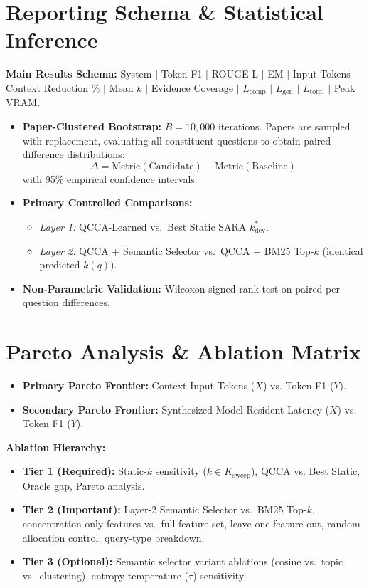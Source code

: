 \documentclass[11pt,a4paper]{article}
\begin{document}
\section{Reporting Schema \& Statistical Inference}
\textbf{Main Results Schema:} System $\mid$ Token F1 $\mid$ ROUGE-L $\mid$ EM $\mid$ Input Tokens $\mid$ Context Reduction \% $\mid$ Mean $k$ $\mid$ Evidence Coverage $\mid$ $L_{\text{comp}}$ $\mid$ $L_{\text{gen}}$ $\mid$ $L_{\text{total}}$ $\mid$ Peak VRAM.
\begin{itemize}
    \item \textbf{Paper-Clustered Bootstrap:} $B=10{,}000$ iterations. Papers are sampled with replacement, evaluating all constituent questions to obtain paired difference distributions:
    \begin{equation*}
    \Delta = \text{Metric}(\text{Candidate}) - \text{Metric}(\text{Baseline})
    \end{equation*}
    with 95\% empirical confidence intervals.
    \item \textbf{Primary Controlled Comparisons:}
    \begin{itemize}
        \item \textit{Layer 1:} QCCA-Learned vs.\ Best Static SARA $k_{\text{dev}}^*$.
        \item \textit{Layer 2:} QCCA + Semantic Selector vs.\ QCCA + BM25 Top-$k$ (identical predicted $k(q)$).
    \end{itemize}
    \item \textbf{Non-Parametric Validation:} Wilcoxon signed-rank test on paired per-question differences.
\end{itemize}

\section{Pareto Analysis \& Ablation Matrix}
\begin{itemize}
    \item \textbf{Primary Pareto Frontier:} Context Input Tokens ($X$) vs. Token F1 ($Y$).
    \item \textbf{Secondary Pareto Frontier:} Synthesized Model-Resident Latency ($X$) vs. Token F1 ($Y$).
\end{itemize}
\textbf{Ablation Hierarchy:}
\begin{itemize}
    \item \textbf{Tier 1 (Required):} Static-$k$ sensitivity ($k \in K_{\text{sweep}}$), QCCA vs. Best Static, Oracle gap, Pareto analysis.
    \item \textbf{Tier 2 (Important):} Layer-2 Semantic Selector vs.\ BM25 Top-$k$, concentration-only features vs.\ full feature set, leave-one-feature-out, random allocation control, query-type breakdown.
    \item \textbf{Tier 3 (Optional):} Semantic selector variant ablations (cosine vs.\ topic vs.\ clustering), entropy temperature ($\tau$) sensitivity.
\end{itemize}
\end{document}
